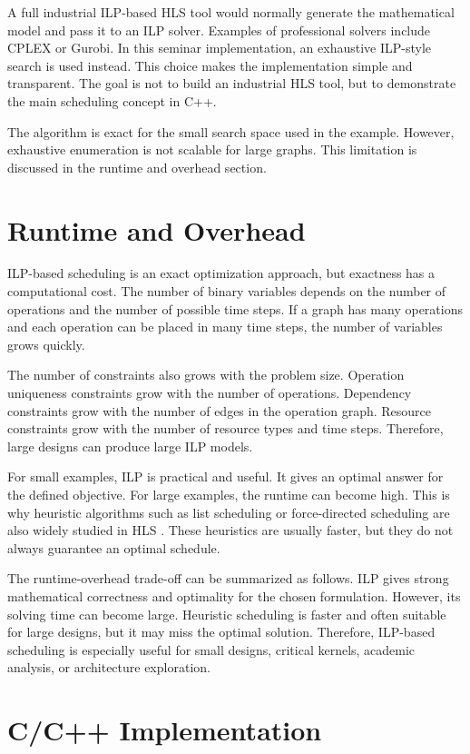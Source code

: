 \documentclass[conference]{IEEEtran}
\begin{document}
	A full industrial ILP-based HLS tool would normally generate the mathematical model and pass it to an ILP solver. Examples of professional solvers include CPLEX or Gurobi. In this seminar implementation, an exhaustive ILP-style search is used instead. This choice makes the implementation simple and transparent. The goal is not to build an industrial HLS tool, but to demonstrate the main scheduling concept in C++.
	
	The algorithm is exact for the small search space used in the example. However, exhaustive enumeration is not scalable for large graphs. This limitation is discussed in the runtime and overhead section.
	
	\section{Runtime and Overhead}
	
	ILP-based scheduling is an exact optimization approach, but exactness has a computational cost. The number of binary variables depends on the number of operations and the number of possible time steps. If a graph has many operations and each operation can be placed in many time steps, the number of variables grows quickly.
	
	The number of constraints also grows with the problem size. Operation uniqueness constraints grow with the number of operations. Dependency constraints grow with the number of edges in the operation graph. Resource constraints grow with the number of resource types and time steps. Therefore, large designs can produce large ILP models.
	
	For small examples, ILP is practical and useful. It gives an optimal answer for the defined objective. For large examples, the runtime can become high. This is why heuristic algorithms such as list scheduling or force-directed scheduling are also widely studied in HLS \cite{demicheli,paulin}. These heuristics are usually faster, but they do not always guarantee an optimal schedule.
	
	The runtime-overhead trade-off can be summarized as follows. ILP gives strong mathematical correctness and optimality for the chosen formulation. However, its solving time can become large. Heuristic scheduling is faster and often suitable for large designs, but it may miss the optimal solution. Therefore, ILP-based scheduling is especially useful for small designs, critical kernels, academic analysis, or architecture exploration.
	
	\section{C/C++ Implementation}
	
\end{document}
